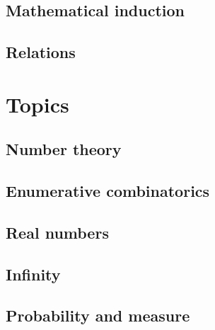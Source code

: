 \documentclass[10pt]{book}
\begin{document}
\chapter{Mathematical induction}
    \label{chMathematicalInduction}
    

\chapter{Relations}
    \label{chRelations}
    

\part{Topics}
\label{ptTopics}

\chapter{Number theory}
    \label{chNumberTheory}
    

\chapter{Enumerative combinatorics}
    \label{chCombinatorics}
    

%     
    
\chapter{Real numbers}
    \label{chRealNumbers}
    
    
\chapter{Infinity}
    \label{chInfinity}
    
    
\chapter{Probability and measure}
    \label{chProbabilityMeasure}
    
    
\end{document}
